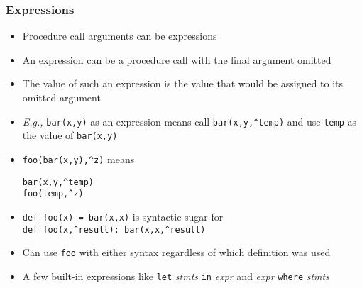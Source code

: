 \documentclass[12pt]{beamer}
\begin{document}
\begin{frame}
\frametitle{Expressions}
\begin{itemize}
\item Procedure call arguments can be expressions
\item An expression can be a procedure call with the final argument omitted
\item The value of such an expression is the value that would be assigned
  to its omitted argument
\item \emph{E.g.,} \texttt{bar(x,y)} as an expression means call
  \texttt{bar(x,y,\^{ }temp)} and use \texttt{temp} as the value of
  \texttt{bar(x,y)}
\item \texttt{foo(bar(x,y),\^{ }z)} \quad means \quad
  \begin{minipage}[c]{0.4\linewidth}
  \texttt{bar(x,y,\^{ }temp)} \\
  \texttt{foo(temp,\^{ }z)}
  \end{minipage}
\item \texttt{def foo(x) = bar(x,x)} is syntactic sugar for \\
\texttt{def foo(x,\^{ }result): bar(x,x,\^{ }result)}
\item Can use \texttt{foo} with either syntax regardless of which
  definition was used
\item A few built-in expressions like \texttt{let} \emph{stmts}
  \texttt{in} \emph{expr} and \emph{expr} \texttt{where} \emph{stmts}
\end{itemize}
\end{frame}
\end{document}
